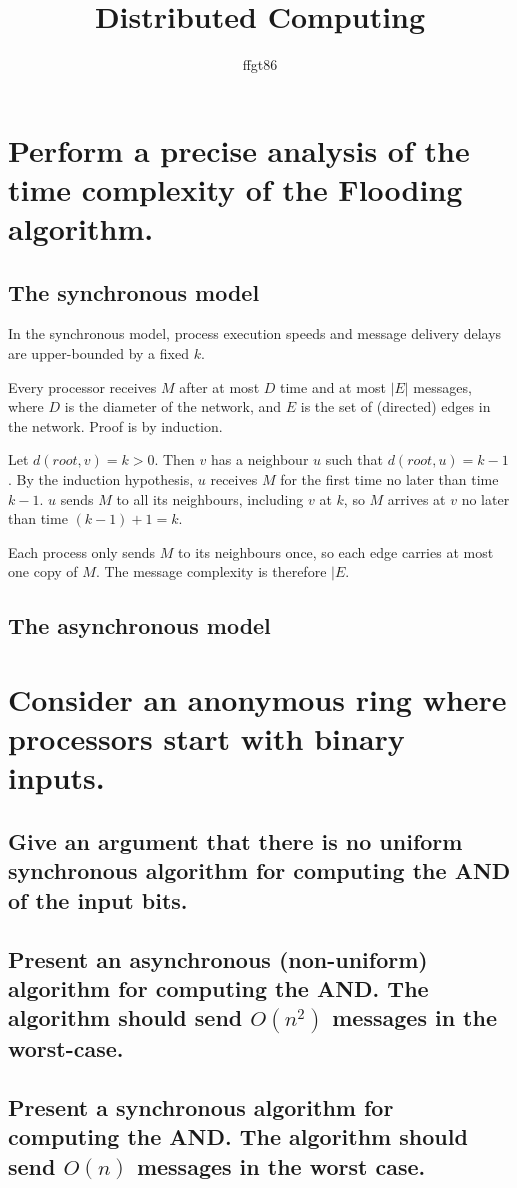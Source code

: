 \documentclass[11pt]{article} %
\title{Distributed Computing}
\author{ffgt86}
\begin{document}
\maketitle

\section{Perform a precise analysis of the time complexity of the Flooding algorithm.}
\subsection{The synchronous model}

In the synchronous model, process execution speeds and message delivery delays are upper-bounded by a fixed $k$.

Every processor receives $M$ after at most $D$ time and at most $|E|$ messages, where $D$ is the diameter of the network, and $E$ is the set of (directed) edges in the network. Proof is by induction.

Let $d(root, v) = k > 0$. Then $v$ has a neighbour $u$ such that $d(root, u) = k - 1$. By the induction hypothesis, $u$ receives $M$ for the first time no later than time $k - 1$. $u$ sends $M$ to all its neighbours, including $v$ at $k$, so $M$ arrives at $v$ no later than time $(k - 1) + 1 = k$.

Each process only sends $M$ to its neighbours once, so each edge carries at most one copy of $M$. The message complexity is therefore $|E$.

\subsection{The asynchronous model}

\section{Consider an anonymous ring where processors start with binary inputs.}

\subsection{Give an argument that there is no uniform synchronous algorithm for computing the AND of the input bits.}
\subsection{Present an asynchronous (non-uniform) algorithm for computing the AND. The algorithm should send $O(n^2)$ messages in the worst-case.}
\subsection{Present a synchronous algorithm for computing the AND. The algorithm should send $O(n)$ messages in the worst case.}
\end{document}
